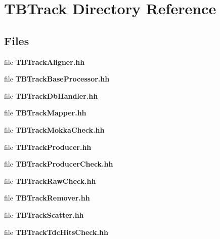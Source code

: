\section{T\-B\-Track Directory Reference}
\label{dir_38a1e192d256857dac51e578368313d0}
\subsection*{Files}
\begin{DoxyCompactItemize}
\item 
file {\bfseries T\-B\-Track\-Aligner.\-hh}
\item 
file {\bfseries T\-B\-Track\-Base\-Processor.\-hh}
\item 
file {\bfseries T\-B\-Track\-Db\-Handler.\-hh}
\item 
file {\bfseries T\-B\-Track\-Mapper.\-hh}
\item 
file {\bfseries T\-B\-Track\-Mokka\-Check.\-hh}
\item 
file {\bfseries T\-B\-Track\-Producer.\-hh}
\item 
file {\bfseries T\-B\-Track\-Producer\-Check.\-hh}
\item 
file {\bfseries T\-B\-Track\-Raw\-Check.\-hh}
\item 
file {\bfseries T\-B\-Track\-Remover.\-hh}
\item 
file {\bfseries T\-B\-Track\-Scatter.\-hh}
\item 
file {\bfseries T\-B\-Track\-Tdc\-Hits\-Check.\-hh}
\end{DoxyCompactItemize}
